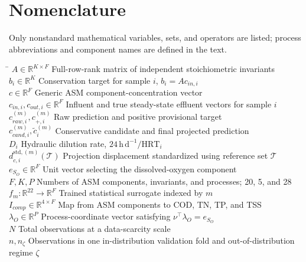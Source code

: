 \documentclass[a4paper,fleqn]{cas-sc}
\newcommand{\csvcomma}{,}
\begin{document}
\section*{Nomenclature}
\noindent Only nonstandard mathematical variables, sets, and operators are listed; process abbreviations and component names are defined in the text.
\begin{tabbing}
\hspace{4.4cm} \= \kill
$A\in\mathbb{R}^{K\times F}$ \> Full-row-rank matrix of independent stoichiometric invariants \\
$b_i\in\mathbb{R}^{K}$ \> Conservation target for sample $i$\csvcomma{} $b_i=A c_{in\csvcomma{}i}$ \\
$c\in\mathbb{R}^{F}$ \> Generic ASM component-concentration vector \\
$c_{in\csvcomma{}i}\csvcomma{}c_{out\csvcomma{}i}\in\mathbb{R}^{F}$ \> Influent and true steady-state effluent vectors for sample $i$ \\
$c_{raw\csvcomma{}i}^{(m)}\csvcomma{}c_{+\csvcomma{}i}^{(m)}$ \> Raw prediction and positive provisional target \\
$c_{cand\csvcomma{}i}^{(m)}\csvcomma{}\tilde c_i^{(m)}$ \> Conservative candidate and final projected prediction \\
$D_i$ \> Hydraulic dilution rate\csvcomma{} $24\,\mathrm{h\,d}^{-1}/\mathrm{HRT}_i$ \\
$d_{c\csvcomma{}i}^{\mathrm{std}\csvcomma{}(m)}(\mathcal{T})$ \> Projection displacement standardized using reference set $\mathcal{T}$ \\
$e_{S_O}\in\mathbb{R}^{F}$ \> Unit vector selecting the dissolved-oxygen component \\
$F\csvcomma{}K\csvcomma{}P$ \> Numbers of ASM components\csvcomma{} invariants\csvcomma{} and processes; 20\csvcomma{} 5\csvcomma{} and 28 \\
$f_m:\mathbb{R}^{22}\to\mathbb{R}^{F}$ \> Trained statistical surrogate indexed by $m$ \\
$I_{comp}\in\mathbb{R}^{4\times F}$ \> Map from ASM components to COD\csvcomma{} TN\csvcomma{} TP\csvcomma{} and TSS \\
$\lambda_O\in\mathbb{R}^{P}$ \> Process-coordinate vector satisfying $\nu^\top\lambda_O=e_{S_O}$ \\
$N$ \> Total observations at a data-scarcity scale \\
$n\csvcomma{}n_\zeta$ \> Observations in one in-distribution validation fold and out-of-distribution regime $\zeta$ \\

\end{tabbing}
\end{document}
